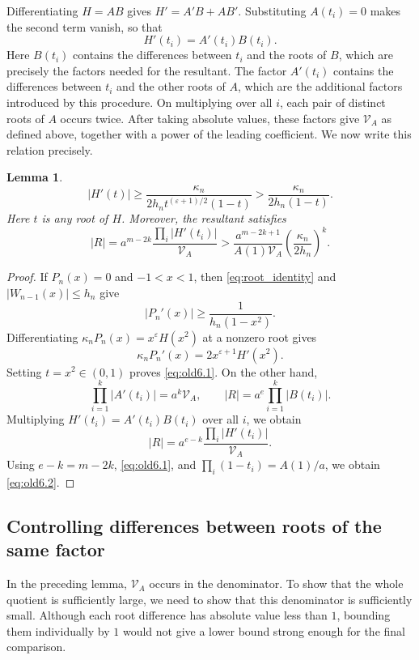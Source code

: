 \documentclass[11pt,a4paper]{article}
\numberwithin{equation}{section}
\newtheorem{lemma}[theorem]{Lemma}
\theoremstyle{definition}
\begin{document}
Differentiating \(H=AB\) gives \(H'=A'B+AB'\). Substituting \(A(t_i)=0\) makes the second term vanish, so that
\[
H'(t_i)=A'(t_i)B(t_i).
\]
Here \(B(t_i)\) contains the differences between \(t_i\) and the roots of \(B\), which are precisely the factors needed for the resultant. The factor \(A'(t_i)\) contains the differences between \(t_i\) and the other roots of \(A\), which are the additional factors introduced by this procedure. On multiplying over all \(i\), each pair of distinct roots of \(A\) occurs twice. After taking absolute values, these factors give \(\mathcal V_A\) as defined above, together with a power of the leading coefficient. We now write this relation precisely.

\begin{lemma}\label{lem:real_product}
\begin{equation}
|H'(t)|\ge
\frac{\kappa_n}{2h_n t^{(\varepsilon+1)/2}(1-t)}
>\frac{\kappa_n}{2h_n(1-t)}.
\label{eq:old6.1}
\end{equation}
Here \(t\) is any root of \(H\). Moreover, the resultant satisfies
\begin{equation}
|R|=a^{m-2k}\frac{\prod_i|H'(t_i)|}{\mathcal V_A}
>\frac{a^{m-2k+1}}{A(1)\mathcal V_A}
\left(\frac{\kappa_n}{2h_n}\right)^k.
\label{eq:old6.2}
\end{equation}
\end{lemma}

\begin{proof}
If \(P_n(x)=0\) and \(-1<x<1\), then \eqref{eq:root_identity} and \(|W_{n-1}(x)|\le h_n\) give
\[
|P_n'(x)|\ge\frac1{h_n(1-x^2)}.
\]
Differentiating \(\kappa_nP_n(x)=x^\varepsilon H(x^2)\) at a nonzero root gives
\[
\kappa_n P_n'(x)=2x^{\varepsilon+1}H'(x^2).
\]
Setting \(t=x^2\in(0,1)\) proves \eqref{eq:old6.1}. On the other hand,
\[
\prod_{i=1}^k|A'(t_i)|=a^k\mathcal V_A,\qquad
|R|=a^e\prod_{i=1}^k|B(t_i)|.
\]
Multiplying \(H'(t_i)=A'(t_i)B(t_i)\) over all \(i\), we obtain
\[
|R|=a^{e-k}\frac{\prod_i|H'(t_i)|}{\mathcal V_A}.
\]
Using \(e-k=m-2k\), \eqref{eq:old6.1}, and
\(\prod_i(1-t_i)=A(1)/a\), we obtain \eqref{eq:old6.2}.
\end{proof}

\subsection{Controlling differences between roots of the same factor}

In the preceding lemma, \(\mathcal V_A\) occurs in the denominator. To show that the whole quotient is sufficiently large, we need to show that this denominator is sufficiently small. Although each root difference has absolute value less than \(1\), bounding them individually by \(1\) would not give a lower bound strong enough for the final comparison.
\end{document}

